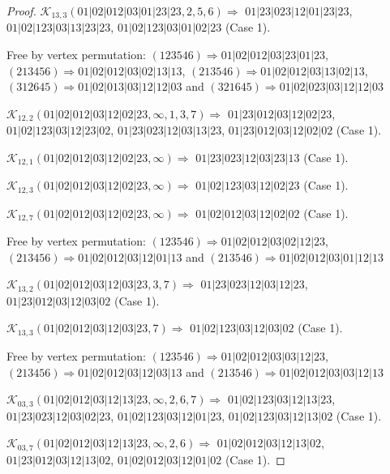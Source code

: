 \documentclass[12pt]{article}
\theoremstyle{plain}
\theoremstyle{definition}
\theoremstyle{remark}
\newcommand{\fancy}[1]{\mathcal{#1}}
\def\K{\fancy{K}}
\begin{document}
\begin{proof}
	$\K_{13,3}(01|02|012|03|01|23|23,2, 5, 6)\Rightarrow $ $01|23|023|12|01|23|23$, $01|02|123|03|13|23|23$, $01|02|123|03|01|02|23$ (Case 1).
	
	
	
	Free by vertex permutation: $(1 2 3 5 4 6)\Rightarrow 01|02|012|03|23|01|23$, $(2 1 3 4 5 6)\Rightarrow 01|02|012|03|02|13|13$, $(2 1 3 5 4 6)\Rightarrow 01|02|012|03|13|02|13$, $(3 1 2 6 4 5)\Rightarrow 01|02|013|03|12|12|03$ and $(3 2 1 6 4 5)\Rightarrow 01|02|023|03|12|12|03$
	
	
	
	\bigskip
	
	$\K_{12,2}(01|02|012|03|12|02|23,\infty,1, 3, 7)\Rightarrow $ $01|23|012|03|12|02|23$, $01|02|123|03|12|23|02$, $01|23|023|12|03|13|23$, $01|23|012|03|12|02|02$ (Case 1).
	
	$\K_{12,1}(01|02|012|03|12|02|23,\infty)\Rightarrow $ $01|23|023|12|03|23|13$ (Case 1).
	
	$\K_{12,3}(01|02|012|03|12|02|23,\infty)\Rightarrow $ $01|02|123|03|12|02|23$ (Case 1).
	
	$\K_{12,7}(01|02|012|03|12|02|23,\infty)\Rightarrow $ $01|02|012|03|12|02|02$ (Case 1).
	
	
	
	Free by vertex permutation: $(1 2 3 5 4 6)\Rightarrow 01|02|012|03|02|12|23$, $(2 1 3 4 5 6)\Rightarrow 01|02|012|03|12|01|13$ and $(2 1 3 5 4 6)\Rightarrow 01|02|012|03|01|12|13$
	
	
	
	\bigskip
	
	$\K_{13,2}(01|02|012|03|12|03|23,3, 7)\Rightarrow $ $01|23|023|12|03|12|23$, $01|23|012|03|12|03|02$ (Case 1).
	
	$\K_{13,3}(01|02|012|03|12|03|23,7)\Rightarrow $ $01|02|123|03|12|03|02$ (Case 1).
	
	
	
	Free by vertex permutation: $(1 2 3 5 4 6)\Rightarrow 01|02|012|03|03|12|23$, $(2 1 3 4 5 6)\Rightarrow 01|02|012|03|12|03|13$ and $(2 1 3 5 4 6)\Rightarrow 01|02|012|03|03|12|13$
	
	
	
	\bigskip
	
	$\K_{03,3}(01|02|012|03|12|13|23,\infty,2, 6, 7)\Rightarrow $ $01|02|123|03|12|13|23$, $01|23|023|12|03|02|23$, $01|02|123|03|12|01|23$, $01|02|123|03|12|13|02$ (Case 1).
	
	$\K_{03,7}(01|02|012|03|12|13|23,\infty,2, 6)\Rightarrow $ $01|02|012|03|12|13|02$, $01|23|012|03|12|13|02$, $01|02|012|03|12|01|02$ (Case 1).
	

\end{proof}
\end{document}
